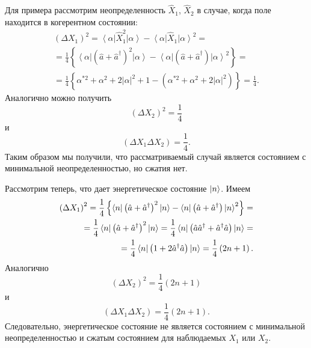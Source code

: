 Для примера рассмотрим неопределенность $\hat{X}_1$, 
$\hat{X}_2$ в случае, когда поле находится в когерентном состоянии:
\begin{eqnarray}
\left(\Delta X_1\right)^2 = 
\left<\alpha\right|\hat{X}_1^2\left|\alpha\right> - 
\left<\alpha\right|\hat{X}_1\left|\alpha\right>^2 = 
\nonumber \\
=\frac{1}{4}
\left\{
\left<\alpha\right|\left(\hat{a} +
\hat{a}^{\dag}\right)^2\left|\alpha\right> -  
\left<\alpha\right|\left(\hat{a} +
\hat{a}^{\dag}\right)\left|\alpha\right>^2 
\right\} = 
\nonumber \\
=\frac{1}{4}
\left\{
\alpha^{*2} + \alpha^2 + 2 \left|\alpha\right|^2 + 1 - 
\left(\alpha^{*2} + \alpha^2 + 2 \left|\alpha\right|^2\right)
\right\} 
=\frac{1}{4}.
\nonumber
\end{eqnarray}
Аналогично можно получить
\begin{equation}
\left(\Delta X_2\right)^2 = \frac{1}{4}
\label{eqPart3SqueezedTaskX2Alpha_1}
\end{equation}
и
\begin{equation}
\left(\Delta X_1 \Delta X_2\right) = \frac{1}{4}.
\label{eqPart3SqueezedTaskX2Alpha_2}
\end{equation}
Таким образом мы получили, что рассматриваемый случай является
состоянием с минимальной неопределенностью, но сжатия нет.

Рассмотрим теперь, что дает энергетическое состояние
$\ket{n}$. Имеем
\begin{eqnarray}
\left(\Delta X_1\right)^2 
=\frac{1}{4}
\left\{
\bra{n}\left(\hat{a} +
\hat{a}^{\dag}\right)^2\ket{n} -  
\bra{n}\left(\hat{a} +
\hat{a}^{\dag}\right)\ket{n}^2 
\right\} = 
\nonumber \\
=
\frac{1}{4}
\bra{n}\left(\hat{a} +
\hat{a}^{\dag}\right)^2\ket{n}
=
\frac{1}{4}
\bra{n}\left(\hat{a}\hat{a}^{\dag} +
\hat{a}^{\dag}\hat{a}\right)\ket{n} =
\nonumber \\
=
\frac{1}{4}
\bra{n}\left(1 + 2
\hat{a}^{\dag}\hat{a}\right)\ket{n}
=\frac{1}{4}\left(2 n + 1\right).
\nonumber
\end{eqnarray}
Аналогично
\begin{equation}
\left(\Delta X_2\right)^2 = \frac{1}{4}\left(2 n + 1\right)
\label{eqPart3SqueezedTaskX2N_1}
\end{equation}
и
\begin{equation}
\left(\Delta X_1 \Delta X_2\right) = \frac{1}{4}\left(2 n + 1\right).
\label{eqPart3SqueezedTaskX2N_2}
\end{equation}
Следовательно, энергетическое состояние не является состоянием с
минимальной неопределенностью и сжатым состоянием для наблюдаемых
$X_1$ или $X_2$.
